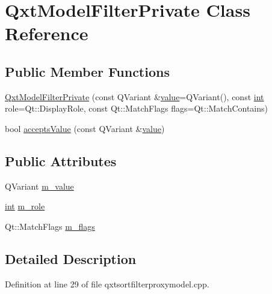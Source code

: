 \hypertarget{class_qxt_model_filter_private}{\section{Qxt\-Model\-Filter\-Private Class Reference}
\label{class_qxt_model_filter_private}
}
\subsection*{Public Member Functions}
\begin{DoxyCompactItemize}
\item 
\hyperlink{class_qxt_model_filter_private_af31ee1319a0324b58e3b2df19bed6469}{Qxt\-Model\-Filter\-Private} (const Q\-Variant \&\hyperlink{glext_8h_aa0e2e9cea7f208d28acda0480144beb0}{value}=Q\-Variant(), const \hyperlink{ioapi_8h_a787fa3cf048117ba7123753c1e74fcd6}{int} role=Qt\-::\-Display\-Role, const Qt\-::\-Match\-Flags flags=Qt\-::\-Match\-Contains)
\item 
bool \hyperlink{class_qxt_model_filter_private_ad25a4e7ee09c26300fc6d6818b6be223}{accepts\-Value} (const Q\-Variant \&\hyperlink{glext_8h_aa0e2e9cea7f208d28acda0480144beb0}{value})
\end{DoxyCompactItemize}
\subsection*{Public Attributes}
\begin{DoxyCompactItemize}
\item 
Q\-Variant \hyperlink{class_qxt_model_filter_private_ad6c574b0f94910a465989b89f0f64250}{m\-\_\-value}
\item 
\hyperlink{ioapi_8h_a787fa3cf048117ba7123753c1e74fcd6}{int} \hyperlink{class_qxt_model_filter_private_a895e81d0e4515bbb42c878cc371271c1}{m\-\_\-role}
\item 
Qt\-::\-Match\-Flags \hyperlink{class_qxt_model_filter_private_a31236dfd8fa7945fcc1bb17d2c9f4715}{m\-\_\-flags}
\end{DoxyCompactItemize}


\subsection{Detailed Description}


Definition at line 29 of file qxtsortfilterproxymodel.\-cpp.




